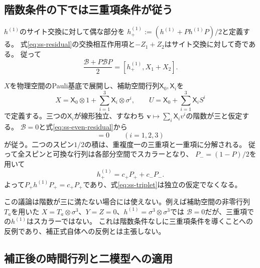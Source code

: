 \subsection{階数条件の下では三重項条件が従う}
\label{subsec:ss-rank}

$h^{(1)}$のサイト交換に対して偶な部分を
$h^{(1)}_+:=(h^{(1)}+Ph^{(1)}P)/2$と定義する。
式\eqref{eq:ss-residual}の交換相互作用項と$-Z_1+Z_2$はサイト交換に対して奇である。
従って
\begin{equation}
\frac{\mathcal B+P\mathcal BP}{2}=[h^{(1)}_+,X_1+X_2].
\label{eq:ss-even-residual}
\end{equation}

$X$を物理空間のPauli基底で展開し、補助空間行列$\mathsf X_0,\mathsf X_i$を
\begin{equation}
X=\mathsf X_0\otimes1+\sum_{i=1}^3\mathsf X_i\otimes\sigma^i,
\qquad U=\mathsf X_0+\sum_{i=1}^3\mathsf X_i S^i
\label{eq:ss-pauli-expansion}
\end{equation}
で定義する。三つの$\mathsf X_i$が線形独立、すなわち
$\boldsymbol v\mapsto\sum_i\mathsf X_i v^i$の階数が三と仮定する。
$\mathcal B=0$と式\eqref{eq:ss-even-residual}から
\begin{equation}
[h^{(1)}_+,\sigma^i_1+\sigma^i_2]=0\qquad(i=1,2,3)
\label{eq:ss-collective-commute}
\end{equation}
が従う。二つのスピン$1/2$の積は、重複度一の三重項と一重項に分解される。
従って全スピンと可換な行列は各部分空間でスカラーとなり、
$P_-=(1-P)/2$を用いて
\begin{equation}
h^{(1)}_+=c_+P_++c_-P_-.
\label{eq:ss-h-even-form}
\end{equation}
よって$P_+h^{(1)}P_+=c_+P_+$であり、式\eqref{eq:ss-triplet}は独立の仮定でなくなる。

この議論は階数が三に満たない場合には使えない。例えば補助空間の非零行列$T_a$を用いた
$X=T_a\otimes\sigma^3$、$Y=Z=0$、$h^{(1)}=\sigma^3\otimes\sigma^3$では
$\mathcal B=0$だが、三重項での$h^{(1)}$はスカラーではない。
これは階数条件なしに三重項条件を導くことへの反例であり、補正式自体への反例とは主張しない。

\subsection{補正後の時間行列と二模型への適用}


